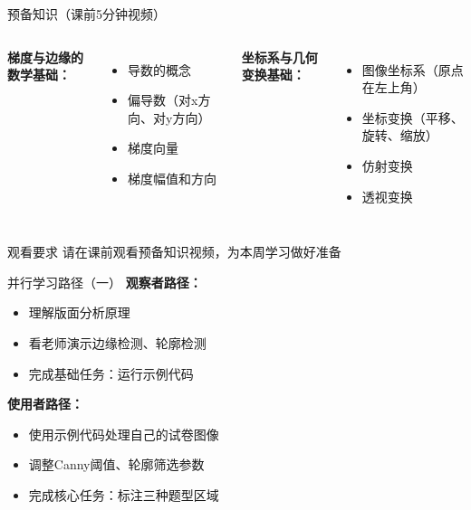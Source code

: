 \begin{frame}{预备知识（课前5分钟视频）}
    \begin{columns}
        \textbf{梯度与边缘的数学基础：}
        \begin{itemize}\itemsep=0pt
            \item 导数的概念
            \item 偏导数（对x方向、对y方向）
            \item 梯度向量
            \item 梯度幅值和方向
        \end{itemize}

        \textbf{坐标系与几何变换基础：}
        \begin{itemize}\itemsep=0pt
            \item 图像坐标系（原点在左上角）
            \item 坐标变换（平移、旋转、缩放）
            \item 仿射变换
            \item 透视变换
        \end{itemize}
    \end{columns}

    \begin{alertblock}{观看要求}
    请在课前观看预备知识视频，为本周学习做好准备
    \end{alertblock}
\end{frame}

\begin{frame}{并行学习路径（一）}
    \textbf{观察者路径：}
    \begin{itemize}
        \item 理解版面分析原理
        \item 看老师演示边缘检测、轮廓检测
        \item 完成基础任务：运行示例代码
    \end{itemize}

    \vspace{0.4cm}

    \textbf{使用者路径：}
    \begin{itemize}
        \item 使用示例代码处理自己的试卷图像
        \item 调整Canny阈值、轮廓筛选参数
        \item 完成核心任务：标注三种题型区域
    \end{itemize}
\end{frame}

